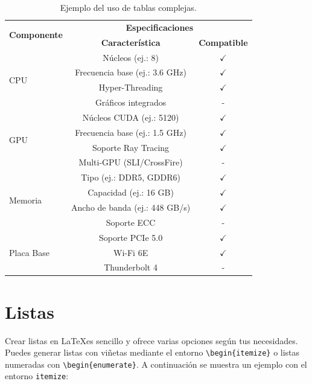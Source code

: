 \begin{table}[!htpb]
    \caption{Ejemplo del uso de tablas complejas.}
    \label{tab:table-04}
    \centering
    \begin{tabular}{lcc}
        \toprule
        \multirow{2}{*}{\textbf{Componente}} & \multicolumn{2}{c}{\textbf{Especificaciones}} \\
        \cmidrule(lr){2-3}
        & \textbf{Característica} & \textbf{Compatible} \\
        \midrule
        \multirow{4}{*}{CPU} & Núcleos (ej.: 8) & $\checkmark$ \\
        & Frecuencia base (ej.: 3.6 GHz) & $\checkmark$ \\
        & Hyper-Threading & $\checkmark$ \\
        & Gráficos integrados & - \\
        \midrule
        \multirow{4}{*}{GPU} & Núcleos CUDA (ej.: 5120) & $\checkmark$ \\
        & Frecuencia base (ej.: 1.5 GHz) & $\checkmark$ \\
        & Soporte Ray Tracing & $\checkmark$ \\
        & Multi-GPU (SLI/CrossFire) & - \\
        \midrule
        \multirow{4}{*}{Memoria} & Tipo (ej.: DDR5, GDDR6) & $\checkmark$ \\
        & Capacidad (ej.: 16 GB) & $\checkmark$ \\
        & Ancho de banda (ej.: 448 GB/s) & $\checkmark$ \\
        & Soporte ECC & - \\
        \midrule
        \multirow{3}{*}{Placa Base} & Soporte PCIe 5.0 & $\checkmark$ \\
        & Wi-Fi 6E & $\checkmark$ \\
        & Thunderbolt 4 & - \\
        \bottomrule
    \end{tabular}
\end{table}

\section{Listas}

Crear listas en \LaTeX es sencillo y ofrece varias opciones según tus necesidades. Puedes generar listas con viñetas mediante el entorno \verb|\begin{itemize}| o listas numeradas con \verb|\begin{enumerate}|. A continuación se muestra un ejemplo con el entorno \verb|itemize|:

